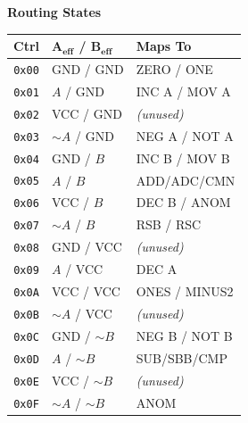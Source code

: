 \documentclass[10pt,landscape,a4paper]{article}
\begin{document}
\begin{minipage}[t]{0.19\textwidth}
        \textbf{\textcolor{arithcolor}{\normalsize Routing States}} \\[0.4em]
    \scriptsize
    \begin{tabular}{@{}cll@{}}
    \toprule
    \textbf{Ctrl} & $\mathbf{A_{eff}}$ \textbf{/} $\mathbf{B_{eff}}$ & \textbf{Maps To} \\
    \midrule
    \texttt{0x00} & GND / GND & ZERO / ONE \\
    \texttt{0x01} & $A$ / GND & INC A / MOV A \\
    \texttt{0x02} & VCC / GND & \textit{(unused)} \\
    \texttt{0x03} & $\sim A$ / GND & NEG A / NOT A \\
    \texttt{0x04} & GND / $B$ & INC B / MOV B \\
    \texttt{0x05} & $A$ / $B$ & ADD/ADC/CMN \\
    \texttt{0x06} & VCC / $B$ & DEC B / ANOM \\
    \texttt{0x07} & $\sim A$ / $B$ & RSB / RSC \\
    \texttt{0x08} & GND / VCC & \textit{(unused)} \\
    \texttt{0x09} & $A$ / VCC & DEC A \\
    \texttt{0x0A} & VCC / VCC & ONES / MINUS2 \\
    \texttt{0x0B} & $\sim A$ / VCC & \textit{(unused)} \\
    \texttt{0x0C} & GND / $\sim B$ & NEG B / NOT B \\
    \texttt{0x0D} & $A$ / $\sim B$ & SUB/SBB/CMP \\
    \texttt{0x0E} & VCC / $\sim B$ & \textit{(unused)} \\
    \texttt{0x0F} & $\sim A$ / $\sim B$ & ANOM \\
    \bottomrule
    \end{tabular}
\end{minipage}%
\hfill
\end{document}
